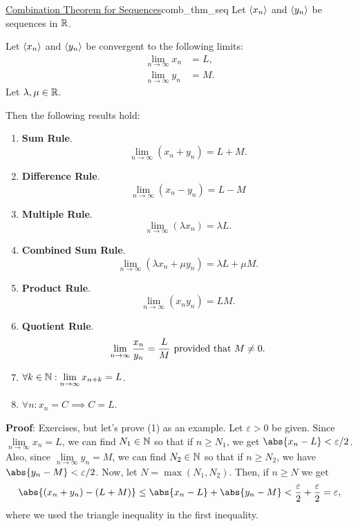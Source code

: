 \begin{Theorem}{\href{https://proofwiki.org/wiki/Combination\_Theorem\_for\_Sequences\#Real\_Sequences}{Combination Theorem for Sequences}}{comb_thm_seq}
    Let $ \langle x_n\rangle $ and $ \langle y_n\rangle $ be sequences in $ \mathbb{R} $.\smallskip

    Let $ \langle x_n\rangle $ and $ \langle y_n\rangle $ be convergent to the following limits:
    \begin{align*}
        \lim\limits_{{n} \to {\infty}}x_n & =L, \\
        \lim\limits_{{n} \to {\infty}}y_n & =M.
    \end{align*}
    Let $ \lambda,\mu\in\mathbb{R} $.\bigskip

    Then the following results hold:
    \begin{enumerate}[(1)]
        \item \textbf{Sum Rule}.
              \[ \lim\limits_{{n} \to {\infty}}(x_n+y_n)=L+M. \]
        \item \textbf{Difference Rule}.
              \[ \lim\limits_{{n} \to {\infty}}(x_n-y_n)=L-M \]
        \item \textbf{Multiple Rule}.
              \[ \lim\limits_{{n} \to {\infty}}(\lambda x_n)=\lambda L. \]
        \item \textbf{Combined Sum Rule}.
              \[ \lim\limits_{{n} \to {\infty}}(\lambda x_n+\mu y_n)=\lambda L+\mu M. \]
        \item \textbf{Product Rule}.
              \[ \lim\limits_{{n} \to {\infty}}(x_n y_n)=LM. \]
        \item \textbf{Quotient Rule}.
              \[ \lim\limits_{{n} \to {\infty}}\frac{x_n}{y_n}=\frac{L}{M}\text{ provided that $ M\ne 0. $} \]
        \item $ \forall k\in\mathbb{N}:\lim\limits_{{n} \to {\infty}}x_{n+k}=L $.
        \item $ \forall n:x_n=C\implies C=L $.
    \end{enumerate}
    \tcblower{}
    \textbf{Proof}: Exercises, but let's prove (1) as an example.
    Let $ \varepsilon>0 $ be given. Since $ \lim\limits_{{n} \to {\infty}}x_n=L $,
    we can find $ N_1\in \mathbb{N} $ so that if $ n\ge N_1 $,
    we get $ \abs{x_n-L}<\varepsilon/2 $. Also,
    since $ \lim\limits_{{n} \to {\infty}}y_n=M $, we can find $ N_2\in \mathbb{N} $
    so that if $ n\ge N_2 $, we have $ \abs{y_n-M}<\varepsilon/2 $.
    Now, let $ N=\max(N_1,N_2) $. Then, if $ n\ge N $
    we get
    \[ \abs{(x_n+y_n)-(L+M)}\le \abs{x_n-L}+\abs{y_n-M}<\frac{\varepsilon}{2}+\frac{\varepsilon}{2}=\varepsilon, \]
    where we used the triangle inequality in the first inequality.
\end{Theorem}
